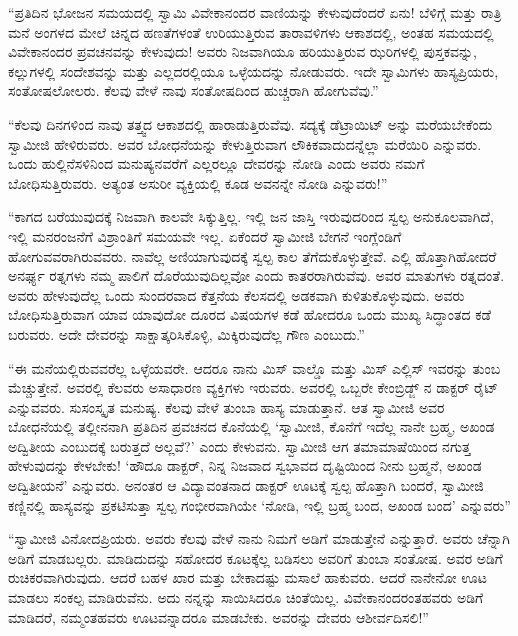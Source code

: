  “ಪ್ರತಿದಿನ ಭೋಜನ ಸಮಯದಲ್ಲಿ ಸ್ವಾಮಿ ವಿವೇಕಾನಂದರ ವಾಣಿಯನ್ನು ಕೇಳುವುದೆಂದರೆ ಏನು! ಬೆಳಿಗ್ಗೆ ಮತ್ತು ರಾತ್ರಿ ಮನೆ ಅಂಗಳದ ಮೇಲೆ ಚಿನ್ನದ ಹಣತೆಗಳಂತೆ ಉರಿಯುತ್ತಿರುವ ತಾರಾವಳಿಗಳು ಆಕಾಶದಲ್ಲಿ, ಅಂತಹ ಸಮಯದಲ್ಲಿ ವಿವೇಕಾನಂದರ ಪ್ರವಚನವನ್ನು ಕೇಳುವುದು! ಅವರು ನಿಜವಾಗಿಯೂ ಹರಿಯುತ್ತಿರುವ ಝರಿಗಳಲ್ಲಿ ಪುಸ್ತಕವನ್ನು, ಕಲ್ಲುಗಳಲ್ಲಿ ಸಂದೇಶವನ್ನು ಮತ್ತು ಎಲ್ಲದರಲ್ಲಿಯೂ ಒಳ್ಳೆಯದನ್ನು ನೋಡುವರು. ಇದೇ ಸ್ವಾಮಿಗಳು ಹಾಸ್ಯಪ್ರಿಯರು, ಸಂತೋಷಲೋಲರು. ಕೆಲವು ವೇಳೆ ನಾವು ಸಂತೋಷದಿಂದ ಹುಚ್ಚರಾಗಿ ಹೋಗುವೆವು.” 

 “ಕೆಲವು ದಿನಗಳಿಂದ ನಾವು ತತ್ತ್ವದ ಆಕಾಶದಲ್ಲಿ ಹಾರಾಡುತ್ತಿರುವೆವು. ಸದ್ಯಕ್ಕೆ ಡೆಟ್ರಾಯಿಟ್ ಅನ್ನು ಮರೆಯಬೇಕೆಂದು ಸ್ವಾಮೀಜಿ ಹೇಳಿರುವರು. ಅವರ ಬೋಧನೆಯನ್ನು ಕೇಳುತ್ತಿರುವಾಗ ಲೌಕಿಕವಾದುದನ್ನೆಲ್ಲಾ ಮರೆಯಿರಿ ಎನ್ನುವರು. ಒಂದು ಹುಲ್ಲಿನೆಸಳಿನಿಂದ ಮನುಷ್ಯನವರೆಗೆ ಎಲ್ಲರಲ್ಲೂ ದೇವರನ್ನು ನೋಡಿ ಎಂದು ಅವರು ನಮಗೆ ಬೋಧಿಸುತ್ತಿರುವರು. ಅತ್ಯಂತ ಅಸುರೀ ವ್ಯಕ್ತಿಯಲ್ಲಿ ಕೂಡ ಅವನನ್ನೇ ನೋಡಿ ಎನ್ನುವರು!” 

 “ಕಾಗದ ಬರೆಯುವುದಕ್ಕೆ ನಿಜವಾಗಿ ಕಾಲವೇ ಸಿಕ್ಕುತ್ತಿಲ್ಲ. ಇಲ್ಲಿ ಜನ ಜಾಸ್ತಿ ಇರುವುದರಿಂದ ಸ್ವಲ್ಪ ಅನುಕೂಲವಾಗಿದೆ, ಇಲ್ಲಿ ಮನರಂಜನೆಗೆ ವಿಶ್ರಾಂತಿಗೆ ಸಮಯವೇ ಇಲ್ಲ. ಏಕೆಂದರೆ ಸ್ವಾಮೀಜಿ ಬೇಗನೆ ಇಂಗ್ಲೆಂಡಿಗೆ ಹೋಗುವವರಾಗಿರುವವರು. ನಾವೆಲ್ಲ ಅಣಿಯಾಗುವುದಕ್ಕೆ ಸ್ವಲ್ಪ ಕಾಲ ತೆಗೆದುಕೊಳ್ಳುತ್ತೇವೆ. ಎಲ್ಲಿ ಹೊತ್ತಾಗಿಹೋದರೆ ಅನರ್ಘ್ಯ ರತ್ನಗಳು ನಮ್ಮ ಪಾಲಿಗೆ ದೊರೆಯುವುದಿಲ್ಲವೋ ಎಂದು ಕಾತರರಾಗಿರುವೆವು. ಅವರ ಮಾತುಗಳು ರತ್ನದಂತೆ. ಅವರು ಹೇಳುವುದೆಲ್ಲ ಒಂದು ಸುಂದರವಾದ ಕೆತ್ತನೆಯ ಕೆಲಸದಲ್ಲಿ ಅಡಕವಾಗಿ ಕುಳಿತುಕೊಳ್ಳುವುದು. ಅವರು ಬೋಧಿಸುತ್ತಿರುವಾಗ ಯಾವ ಯಾವುದೋ ದೂರದ ವಿಷಯಗಳ ಕಡೆ ಹೋದರೂ ಒಂದು ಮುಖ್ಯ ಸಿದ್ಧಾಂತದ ಕಡೆ ಬರುವರು. ಅದೇ ದೇವರನ್ನು ಸಾಕ್ಷಾತ್ಕರಿಸಿಕೊಳ್ಳಿ, ಮಿಕ್ಕಿರುವುದೆಲ್ಲ ಗೌಣ ಎಂಬುದು.” 

 “ಈ ಮನೆಯಲ್ಲಿರುವವರೆಲ್ಲ ಒಳ್ಳೆಯವರೇ. ಆದರೂ ನಾನು ಮಿಸ್ ವಾಲ್ಡೊ ಮತ್ತು ಮಿಸ್ ಎಲ್ಲಿಸ್ ಇವರನ್ನು ತುಂಬ ಮೆಚ್ಚುತ್ತೇನೆ. ಅವರಲ್ಲಿ ಕೆಲವರು ಅಸಾಧಾರಣ ವ್ಯಕ್ತಿಗಳು ಇರುವರು. ಅವರಲ್ಲಿ ಒಬ್ಬರೇ ಕೇಂಬ್ರಿಡ್ಜ್ ನ ಡಾಕ್ಟರ್ ರೈಟ್ ಎನ್ನುವವರು. ಸುಸಂಸ್ಕೃತ ಮನುಷ್ಯ. ಕೆಲವು ವೇಳೆ ತುಂಬಾ ಹಾಸ್ಯ ಮಾಡುತ್ತಾನೆ. ಆತ ಸ್ವಾಮೀಜಿ ಅವರ ಬೋಧನೆಯಲ್ಲಿ ತಲ್ಲೀನನಾಗಿ ಪ್ರತಿದಿನ ಪ್ರವಚನದ ಕೊನೆಯಲ್ಲಿ ‘ಸ್ವಾಮೀಜಿ, ಕೊನೆಗೆ ಇದೆಲ್ಲ ನಾನೇ ಬ್ರಹ್ಮ, ಅಖಂಡ ಅದ್ವಿತೀಯ ಎಂಬುದಕ್ಕೆ ಬರುತ್ತದೆ ಅಲ್ಲವೆ?’ ಎಂದು ಕೇಳುವನು. ಸ್ವಾಮೀಜಿ ಆಗ ತಮಾಮಾಷೆಯಿಂದ ನಗುತ್ತ ಹೇಳುವುದನ್ನು ಕೇಳಬೇಕು! ‘ಹೌದೂ ಡಾಕ್ಟರ್, ನಿನ್ನ ನಿಜವಾದ ಸ್ವಭಾವದ ದೃಷ್ಟಿಯಿಂದ ನೀನು ಬ್ರಹ್ಮನೆ, ಅಖಂಡ ಅದ್ವಿತೀಯನೆ’ ಎನ್ನುವರು. ಅನಂತರ ಆ ವಿದ್ಯಾವಂತನಾದ ಡಾಕ್ಟರ್ ಊಟಕ್ಕೆ ಸ್ವಲ್ಪ ಹೊತ್ತಾಗಿ ಬಂದರೆ, ಸ್ವಾಮೀಜಿ ಕಣ್ಣಿನಲ್ಲಿ ಹಾಸ್ಯವನ್ನು ಪ್ರಕಟಿಸುತ್ತಾ ಸ್ವಲ್ಪ ಗಂಭೀರವಾಗಿಯೇ ‘ನೋಡಿ, ಇಲ್ಲಿ ಬ್ರಹ್ಮ ಬಂದ, ಅಖಂಡ ಬಂದ’ ಎನ್ನುವರು” 

 “ಸ್ವಾಮೀಜಿ ವಿನೋದಪ್ರಿಯರು. ಅವರು ಕೆಲವು ವೇಳೆ ನಾನು ನಿಮಗೆ ಅಡಿಗೆ ಮಾಡುತ್ತೇನೆ ಎನ್ನುತ್ತಾರೆ. ಅವರು ಚೆನ್ನಾಗಿ ಅಡಿಗೆ ಮಾಡಬಲ್ಲರು. ಮಾಡಿದುದನ್ನು ಸಹೋದರ ಕೂಟಕ್ಕೆಲ್ಲ ಬಡಿಸಲು ಅವರಿಗೆ ತುಂಬಾ ಸಂತೋಷ. ಅವರ ಅಡಿಗೆ ರುಚಿಕರವಾಗಿರುವುದು. ಆದರೆ ಬಹಳ ಖಾರ ಮತ್ತು ಬೇಕಾದಷ್ಟು ಮಸಾಲೆ ಹಾಕುವರು. ಆದರೆ ನಾನೇನೋ ಊಟ ಮಾಡಲು ಸಂಕಲ್ಪ ಮಾಡಿರುವೆನು. ಅದು ನನ್ನನ್ನು ಸಾಯಿಸಿದರೂ ಚಿಂತೆಯಿಲ್ಲ. ವಿವೇಕಾನಂದರಂತಹವರು ಅಡಿಗೆ ಮಾಡಿದರೆ, ನಮ್ಮಂತಹವರು ಊಟವನ್ನಾದರೂ ಮಾಡಬೇಕು. ಅವರನ್ನು ದೇವರು ಆಶೀರ್ವದಿಸಲಿ!” 

